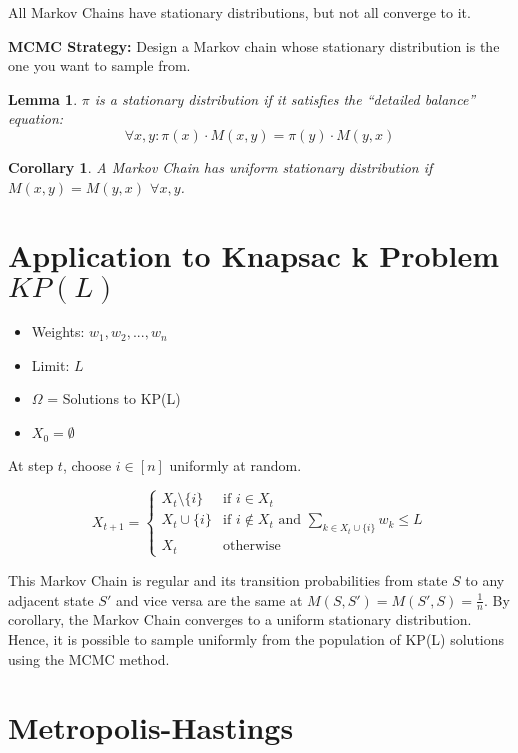 \documentclass[twoside]{article}
\newtheorem{lemma}[theorem]{Lemma}
\newtheorem{corollary}[theorem]{Corollary}
\begin{document}
All Markov Chains have stationary distributions, but not all converge to it.

\textbf{MCMC Strategy:}  Design a Markov chain whose stationary distribution is the one you want to sample from.

\begin{lemma}
   $\pi$ is a stationary distribution if it satisfies the ``detailed balance'' equation:
   $$
   \forall x,y: \pi(x) \cdot M(x, y) = \pi(y) \cdot M(y, x)
   $$
\end{lemma}

\begin{corollary}
   A Markov Chain has uniform stationary distribution if $M(x, y) = M(y, x)$ $\forall x, y$.
\end{corollary}

\section{Application to Knapsac k Problem $KP(L)$}

\begin{itemize}
   \item Weights: $w_1,w_2, ..., w_n$
   \item Limit: $L$
   \item $\Omega$ = Solutions to KP(L)
   \item $X_0 = \emptyset$
\end{itemize}

At step $t$, choose $i \in [n]$ uniformly at random.

$$
X_{t+1} = \begin{cases}
   X_t \setminus \{i\} & \text{if } i \in X_t \\
   X_t \cup \{i\} & \text{if } i \notin X_t \text{ and } \sum_{k \in X_t \cup \{i\}} w_k \leq L\\
   X_t & \text{otherwise}
\end{cases}
$$

This Markov Chain is regular and its transition probabilities from state $S$ to any adjacent state $S'$ and vice versa are the same at $M(S, S') = M(S', S) = \frac{1}{n}$. By corollary, the Markov Chain converges to a uniform stationary distribution. Hence, it is possible to sample uniformly from the population of KP(L) solutions using the MCMC method.

\section{Metropolis-Hastings}
\end{document}
